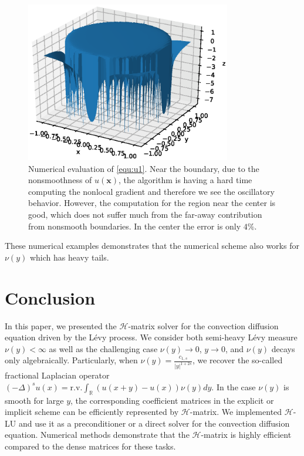 \documentclass[10pt,a4paper]{article}
\newcommand{\RR}[0]{\mathbb{R}}
\newcommand{\bx}[0]{\mathbf{x}}
\theoremstyle{definition}
\begin{document}
\begin{figure}[H] %
\centering
\includegraphics[width=0.8\textwidth,keepaspectratio]{figures/fig8}
\caption{Numerical evaluation of \cref{equ:u1}. Near the boundary, due to the nonsmoothness of $u(\bx)$, the algorithm is having a hard time computing the nonlocal gradient and therefore we see the oscillatory behavior. However, the computation for the region near the center is  good, which does not suffer much from the far-away contribution from nonsmooth boundaries. In the center the error is only $4\%$.}
\label{fig:fig8}
\end{figure}

These numerical examples demonstrates that the numerical scheme also works for $\nu(y)$ which has heavy tails. 


\section{Conclusion}

In this paper, we presented the $\mathcal{H}$-matrix solver for the convection diffusion equation driven by the L\'evy process. We consider both semi-heavy L\'evy measure $\nu(y)<\infty$ as well as the challenging case $\nu(y)\rightarrow 0$, $y\rightarrow 0$, and $\nu(y)$ decays only algebraically. Particularly, when $\nu(y) = \frac{c_{1,s}}{|y|^{1+2s}}$, we recover the so-called fractional Laplacian operator $(-\Delta)^s u(x) =\mathrm{r.v.} \int_{\RR} (u(x+y)-u(x))\nu(y)dy$. In the case $\nu(y)$ is smooth for large $y$, the corresponding coefficient matrices in the explicit or implicit scheme can be efficiently represented by $\mathcal{H}$-matrix. We implemented $\mathcal{H}$-LU and use it as a preconditioner or a direct solver for the convection diffusion equation. Numerical methods demonstrate that the $\mathcal{H}$-matrix is highly efficient compared to the dense matrices for these tasks. 
\end{document}
